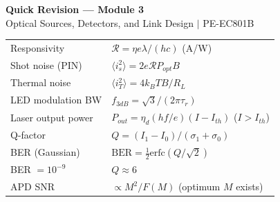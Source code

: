 \documentclass[12pt,a4paper]{article}
\renewcommand{\arraystretch}{1.45}
\begin{document}
\newpage
\begin{center}
  {\large\bfseries\color{myred} Quick Revision --- Module 3}\\[3pt]
  {\small\color{mydark} Optical Sources, Detectors, and Link Design $|$ PE-EC801B}
\end{center}
\noindent{\color{myred}\rule{\linewidth}{1.2pt}}
\vspace{4pt}

\begin{tcolorbox}[formulabox, title={\textbf{Key Formulas at a Glance}}]
\renewcommand{\arraystretch}{1.35}
\begin{tabularx}{\linewidth}{B{5.0cm} X}
Responsivity & $\mathcal{R} = \eta e \lambda / (hc)$ \quad (A/W) \\[4pt]
Shot noise (PIN) & $\langle i_s^2 \rangle = 2e\mathcal{R}P_{opt}B$ \\[4pt]
Thermal noise & $\langle i_T^2 \rangle = 4k_BTB/R_L$ \\[4pt]
LED modulation BW & $f_{3dB} = \sqrt{3}/(2\pi\tau_r)$ \\[4pt]
Laser output power & $P_{out} = \eta_d(hf/e)(I - I_{th})$ \quad ($I > I_{th}$) \\[4pt]
Q-factor & $Q = (I_1 - I_0)/(\sigma_1 + \sigma_0)$ \\[4pt]
BER (Gaussian) & $\text{BER} = \frac{1}{2}\text{erfc}(Q/\sqrt{2})$ \\[4pt]
BER $= 10^{-9}$ & $Q \approx 6$ \\[4pt]
APD SNR & $\propto M^2 / F(M)$ \quad (optimum $M$ exists) \\[4pt]
\end{tabularx}
\end{tcolorbox}
\end{document}
